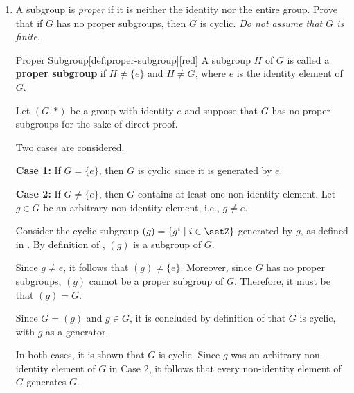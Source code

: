 \begin{enumerate}
\begin{subprove}
    In both cases, it is shown that $H$ is cyclic.
    Since $H$ was an arbitrary subgroup of $G$, it follows that every subgroup of $G$ is cyclic.
  \end{subprove}





  \newpage
  
  \item A subgroup is \textit{proper} if it is neither the identity 
  nor the entire group. Prove that if $G$ has no proper subgroups, 
  then $G$ is cyclic. \textit{Do not assume that $G$ is finite}.
  \begin{define}{Proper Subgroup}[def:proper-subgroup][red]
    A subgroup $H$ of $G$ is called a \textbf{proper subgroup} if $H \neq \{e\}$ and $H \neq G$, 
    where $e$ is the identity element of $G$.
  \end{define}
  \begin{subprove}
    Let $(G, *)$ be a group with identity $e$ and suppose that $G$ has no proper subgroups for the sake of direct proof.
    
    Two cases are considered.
    
    \textbf{Case 1:} If $G = \{e\}$, then $G$ is cyclic since it is generated by $e$.
    
    \textbf{Case 2:} If $G \neq \{e\}$, then $G$ contains at least one non-identity element.
    Let $g \in G$ be an arbitrary non-identity element, i.e., $g \neq e$.
    
    Consider the cyclic subgroup $(g) = \{g^i \mid i \in \setZ\}$ generated by $g$, 
    as defined in .
    By definition of , $(g)$ is a subgroup of $G$.
    
    Since $g \neq e$, it follows that $(g) \neq \{e\}$.
    Moreover, since $G$ has no proper subgroups, $(g)$ cannot be a proper subgroup of $G$.
    Therefore, it must be that $(g) = G$.
    
    Since $G = (g)$ and $g \in G$, it is concluded by definition of  that $G$ is cyclic, 
    with $g$ as a generator.
    
    In both cases, it is shown that $G$ is cyclic.
    Since $g$ was an arbitrary non-identity element of $G$ in Case 2, 
    it follows that every non-identity element of $G$ generates $G$.
  \end{subprove}








\end{enumerate}
